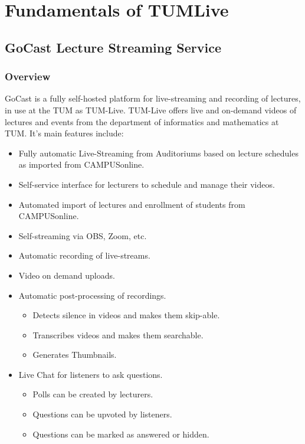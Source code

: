 
\chapter{Fundamentals of TUMLive}\label{chapter:introduction}

\section{GoCast Lecture Streaming Service}

\subsection{Overview}

GoCast is a fully self-hosted platform for live-streaming and recording of lectures, in use at the \ac{TUM} as TUM-Live.
TUM-Live offers live and on-demand videos of lectures and events from the department of informatics and mathematics at \ac{TUM}. 
It's main features include:

\begin{itemize}
    \item Fully automatic Live-Streaming from Auditoriums based on lecture schedules as imported from CAMPUSonline.
    \item Self-service interface for lecturers to schedule and manage their videos.
    \item Automated import of lectures and enrollment of students from CAMPUSonline.
    \item Self-streaming via OBS, Zoom, etc.
    \item Automatic recording of live-streams.
    \item Video on demand uploads.
    \item Automatic post-processing of recordings.
    \begin{itemize}
        \item Detects silence in videos and makes them skip-able.
        \item Transcribes videos and makes them searchable.
        \item Generates Thumbnails.
    \end{itemize}
    \item Live Chat for listeners to ask questions.
    \begin{itemize}
        \item Polls can be created by lecturers.
        \item Questions can be upvoted by listeners.
        \item Questions can be marked as answered or hidden.
    \end{itemize}
\end{itemize}

